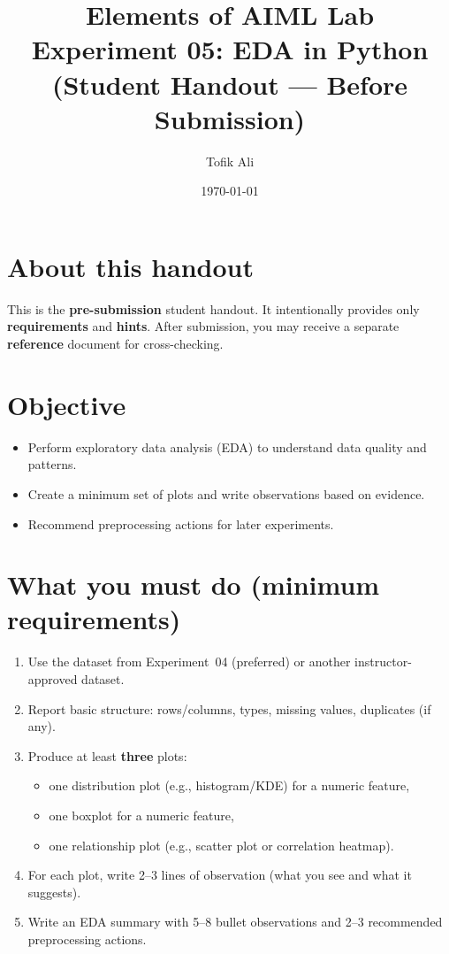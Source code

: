 \documentclass[11pt]{article}
\title{Elements of AIML Lab\\Experiment 05: EDA in Python (Student Handout — Before Submission)}
\author{Tofik Ali}
\date{\today}
\begin{document}
\maketitle
\tableofcontents

\section{About this handout}
This is the \textbf{pre-submission} student handout.
It intentionally provides only \textbf{requirements} and \textbf{hints}.
After submission, you may receive a separate \textbf{reference} document for cross-checking.

\section{Objective}
\begin{itemize}[leftmargin=*]
  \item Perform exploratory data analysis (EDA) to understand data quality and patterns.
  \item Create a minimum set of plots and write observations based on evidence.
  \item Recommend preprocessing actions for later experiments.
\end{itemize}

\section{What you must do (minimum requirements)}
\begin{enumerate}[leftmargin=*]
  \item Use the dataset from Experiment~04 (preferred) or another instructor-approved dataset.
  \item Report basic structure: rows/columns, types, missing values, duplicates (if any).
  \item Produce at least \textbf{three} plots:
  \begin{itemize}[leftmargin=*]
    \item one distribution plot (e.g., histogram/KDE) for a numeric feature,
    \item one boxplot for a numeric feature,
    \item one relationship plot (e.g., scatter plot or correlation heatmap).
  \end{itemize}
  \item For each plot, write 2--3 lines of observation (what you see and what it suggests).
  \item Write an EDA summary with 5--8 bullet observations and 2--3 recommended preprocessing actions.
\end{enumerate}
\end{document}
